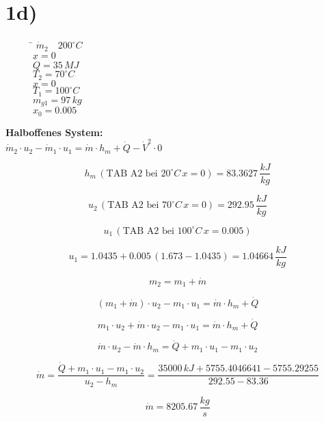 

\section*{1d)}

\begin{figure}[h!]
\centering
\begin{minipage}{0.4\textwidth}
\centering
\begin{tabbing}
\hspace{2cm} \= \kill
\(\dot{m}_2 \quad 200^\circ C\) \\
\(x = 0\) \\
\(\dot{Q} = 35 \, MJ\) \\
\(T_2 = 70^\circ C\) \\
\(x = 0\) \\
\(T_1 = 100^\circ C\) \\
\(m_{g1} = 97 \, kg\) \\
\(x_0 = 0.005\)
\end{tabbing}
\end{minipage}
\end{figure}

\textbf{Halboffenes System:} \\
\(\dot{m}_2 \cdot u_2 - \dot{m}_1 \cdot u_1 = \dot{m} \cdot h_m + \dot{Q} - \dot{V}^2 \cdot 0\)

\[
h_m \, (\text{TAB A2 bei } 20^\circ C \, x = 0) = 83.3627 \, \frac{kJ}{kg}
\]

\[
u_2 \, (\text{TAB A2 bei } 70^\circ C \, x = 0) = 292.95 \, \frac{kJ}{kg}
\]

\[
u_1 \, (\text{TAB A2 bei } 100^\circ C \, x = 0.005)
\]

\[
u_1 = 1.0435 + 0.005 \, (1.673 - 1.0435) = 1.04664 \, \frac{kJ}{kg}
\]

\[
m_2 = m_1 + \dot{m}
\]

\[
(m_1 + \dot{m}) \cdot u_2 - m_1 \cdot u_1 = \dot{m} \cdot h_m + \dot{Q}
\]

\[
m_1 \cdot u_2 + \dot{m} \cdot u_2 - m_1 \cdot u_1 = \dot{m} \cdot h_m + \dot{Q}
\]

\[
\dot{m} \cdot u_2 - \dot{m} \cdot h_m = \dot{Q} + m_1 \cdot u_1 - m_1 \cdot u_2
\]

\[
\dot{m} = \frac{\dot{Q} + m_1 \cdot u_1 - m_1 \cdot u_2}{u_2 - h_m} = \frac{35000 \, kJ + 5755.4046641 - 5755.29255}{292.55 - 83.36}
\]

\[
\dot{m} = 8205.67 \, \frac{kg}{s}
\]